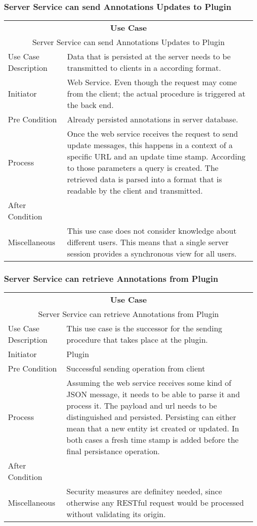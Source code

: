 \subsubsection[Server: Sending Annotations]{Server Service can send Annotations Updates to Plugin}
\begin{tabular}{|l| p{5cm} |}
\hline 
 \multicolumn{2}{|c|}{\textbf{Use Case }}\\
 \multicolumn{2}{|c|}{Server Service can send Annotations Updates to Plugin}\\ 
\hline 
Use Case Description & Data that is persisted at the server needs to be transmitted to clients in a according format.\\ 
\hline 
Initiator & Web Service. Even though the request may come from the client; the actual procedure is triggered at the back end. \\ 
\hline
Pre Condition & Already persisted annotations in server database. \\ 
\hline 
Process & Once the web service receives the request to send update messages, this happens in a context of a specific URL and an update time stamp. According to those parameters a query is created. The retrieved data is parsed into a format that is readable by the client and transmitted. \\ 
\hline 
After Condition & \\ 
\hline 
Miscellaneous & This use case does not consider knowledge about different users. This means that a single server session provides a synchronous view for all users. \\ 
\hline 
\end{tabular} 

\subsubsection[Server: Receiving Annotations]{Server Service can retrieve Annotations from Plugin}
\begin{tabular}{|l| p{5cm} |}
\hline 
 \multicolumn{2}{|c|}{\textbf{Use Case }} \\ 
 \multicolumn{2}{|c|}{Server Service can retrieve Annotations from Plugin} \\ 
\hline 
Use Case Description &  This use case is the successor for the sending procedure that takes place at the plugin.\\ 
\hline 
Initiator & Plugin \\ 
\hline 
Pre Condition & Successful sending operation from client \\ 
\hline 
Process & Assuming the web service receives some kind of JSON message, it needs to be able to parse it and process it. The payload and url needs to be distinguished and persisted. Persisting can either mean that a new entity ist created or updated. In both cases a fresh time stamp is added before the final persistance operation. \\ 
\hline 
After Condition & \\ 
\hline 
Miscellaneous & Security measures are definitey needed, since otherwise any RESTful request would be processed without validating its origin. \\ 
\hline 
\end{tabular} 
